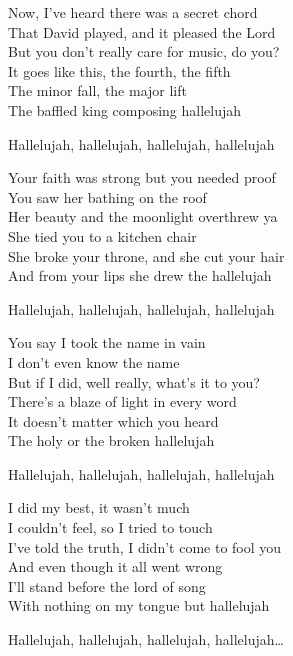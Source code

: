 \documentclass[11pt]{book}
\begin{document}
\benedizionefinale

\congedo

\settowidth{\versewidth}{Ain't no valley low, ain't no river wide enough baby}
\begin{canzone}%
Now, I've heard there was a secret chord\\
That David played, and it pleased the Lord\\
But you don't really care for music, do you?\\
It goes like this, the fourth, the fifth\\
The minor fall, the major lift\\
The baffled king composing hallelujah

\begin{ritornello}
Hallelujah, hallelujah, hallelujah, hallelujah 
\end{ritornello}

Your faith was strong but you needed proof\\
You saw her bathing on the roof\\
Her beauty and the moonlight overthrew ya\\
She tied you to a kitchen chair\\
She broke your throne, and she cut your hair\\
And from your lips she drew the hallelujah

\begin{ritornello}
Hallelujah, hallelujah, hallelujah, hallelujah
\end{ritornello}

You say I took the name in vain\\
I don't even know the name\\
But if I did, well really, what's it to you?\\
There's a blaze of light in every word\\
It doesn't matter which you heard\\
The holy or the broken hallelujah

\begin{ritornello}
Hallelujah, hallelujah, hallelujah, hallelujah
\end{ritornello}

I did my best, it wasn't much\\
I couldn't feel, so I tried to touch\\
I've told the truth, I didn't come to fool you\\
And even though it all went wrong\\
I'll stand before the lord of song\\
With nothing on my tongue but hallelujah

\begin{ritornello}
Hallelujah, hallelujah, hallelujah, hallelujah\dots
\end{ritornello}
\end{canzone}
\end{document}
